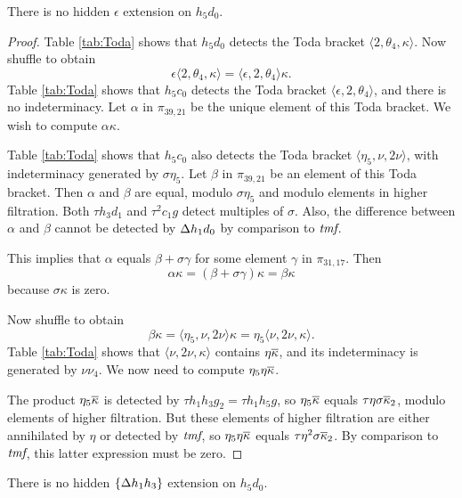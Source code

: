 \begin{lemma}
\label{lem:epsilon-h5d0}
There is no hidden $\epsilon$ extension on $h_5 d_0$.
\end{lemma}

\begin{proof}
Table \ref{tab:Toda} shows that
$h_5 d_0$ detects the Toda bracket $\langle 2, \theta_4, \kappa \rangle$.
Now shuffle to obtain
\[
\epsilon \langle 2, \theta_4, \kappa \rangle =
\langle \epsilon, 2, \theta_4 \rangle \kappa.
\]
Table \ref{tab:Toda} shows that
$h_5 c_0$ detects the Toda bracket
$\langle \epsilon, 2, \theta_4 \rangle$, and there is no indeterminacy.
Let $\alpha$ in $\pi_{39,21}$ be the unique element of this Toda bracket.
We wish to compute $\alpha \kappa$.

Table \ref{tab:Toda} shows that
$h_5 c_0$ also detects the Toda bracket 
$\langle \eta_5, \nu, 2 \nu \rangle$, 
with indeterminacy generated by $\sigma \eta_5$.
Let $\beta$ in $\pi_{39,21}$ be an element of
this Toda bracket.
Then $\alpha$ and $\beta$ are equal, modulo
$\sigma \eta_5$ and modulo elements in higher filtration.
Both $\tau h_3 d_1$ and $\tau^2 c_1 g$ detect multiples of
$\sigma$.
Also, the difference between $\alpha$ and $\beta$ cannot be
detected by $\Delta h_1 d_0$ by comparison to $\textit{tmf}$.

This implies that $\alpha$ equals $\beta + \sigma \gamma$
for some element $\gamma$ in $\pi_{31,17}$.
Then
\[
\alpha \kappa = (\beta + \sigma \gamma) \kappa = \beta \kappa
\]
because $\sigma \kappa$ is zero.

Now shuffle to obtain
\[
\beta \kappa = \langle \eta_5, \nu, 2 \nu \rangle \kappa =
\eta_5 \langle \nu, 2\nu, \kappa \rangle.
\]
Table \ref{tab:Toda} shows that
$\langle \nu, 2\nu, \kappa \rangle$
contains $\eta \overline{\kappa}$, and its indeterminacy is generated by
$\nu \nu_4$.
We now need to compute $\eta_5 \eta \overline{\kappa}$.

The product $\eta_5 \overline{\kappa}$ is detected by
$\tau h_1 h_3 g_2 = \tau h_1 h_5 g$, so
$\eta_5 \overline{\kappa}$ equals $\tau \eta \sigma \overline{\kappa}_2$,
modulo elements of higher filtration.
But these elements of higher filtration are either annihilated
by $\eta$ or detected by $\textit{tmf}$, so 
$\eta_5 \eta \overline{\kappa}$ equals
$\tau \eta^2 \sigma \overline{\kappa}_2$.
By comparison to $\textit{tmf}$, this latter expression must be zero.
\end{proof}

\begin{lemma}
\label{lem:Dh1h3-h5d0}
There is no hidden $\{\Delta h_1 h_3\}$ extension on 
$h_5 d_0$.
\end{lemma}

